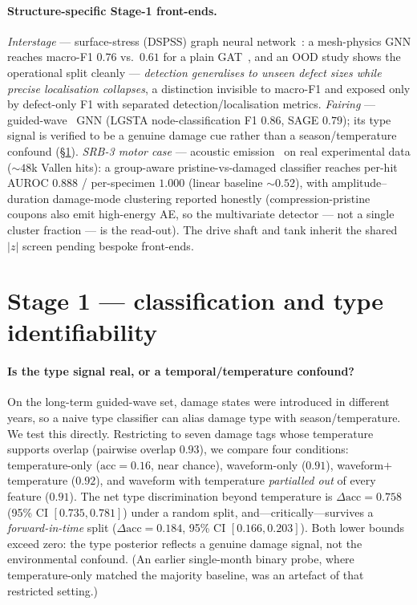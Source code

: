 \documentclass[11pt]{article}
\begin{document}
\paragraph{Structure-specific Stage-1 front-ends.} \emph{Interstage} ---
surface-stress (DSPSS) graph neural network~\cite{nishioka2025development}: a
mesh-physics GNN reaches macro-F1 $0.76$ vs.\ $0.61$ for a plain GAT~\cite{velickovic2018graph}, and an OOD study shows the operational
split cleanly --- \emph{detection generalises to unseen defect sizes while precise
localisation collapses}, a distinction invisible to macro-F1 and exposed only by
defect-only F1 with separated detection/localisation metrics. \emph{Fairing} ---
guided-wave~\cite{su2006guided} GNN (LGSTA node-classification F1 $0.86$, SAGE $0.79$); its type signal
is verified to be a genuine damage cue rather than a season/temperature confound
(\S\ref{sec:stage1}). \emph{SRB-3 motor case} --- acoustic emission~\cite{saeedifar2020damage} on real
experimental data ($\sim$$48$k Vallen hits): a group-aware pristine-vs-damaged
classifier reaches per-hit AUROC $0.888$ / per-specimen $1.000$ (linear baseline
$\sim$$0.52$), with amplitude--duration damage-mode clustering reported honestly
(compression-pristine coupons also emit high-energy AE, so the multivariate
detector --- not a single cluster fraction --- is the read-out). The drive shaft
and tank inherit the shared $|z|$ screen pending bespoke front-ends.

\section{Stage 1 --- classification and type identifiability}
\label{sec:stage1}

\paragraph{Is the type signal real, or a temporal/temperature confound?}
On the long-term guided-wave set, damage states were introduced in different
years, so a naive type classifier can alias damage type with
season/temperature. We test this directly. Restricting to seven damage tags
whose temperature supports overlap (pairwise overlap $0.93$), we compare four
conditions: temperature-only ($\text{acc}=0.16$, near chance), waveform-only
($0.91$), waveform${+}$temperature ($0.92$), and waveform with temperature
\emph{partialled out} of every feature ($0.91$). The net type discrimination
beyond temperature is $\Delta\text{acc}=0.758$ (95\% CI $[0.735,0.781]$) under a
random split, and---critically---survives a \emph{forward-in-time} split
($\Delta\text{acc}=0.184$, 95\% CI $[0.166,0.203]$). Both lower bounds exceed
zero: the type posterior reflects a genuine damage signal, not the environmental
confound. (An earlier single-month binary probe, where temperature-only matched
the majority baseline, was an artefact of that restricted setting.)
\end{document}
